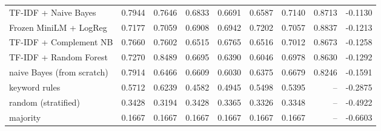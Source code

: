 \begin{table}[htbp]
\begin{tabular}{lrrrrrrrr}
TF-IDF + Naive Bayes & 0.7944 & 0.7646 & 0.6833 & 0.6691 & 0.6587 & 0.7140 & 0.8713 & -0.1130 \\
Frozen MiniLM + LogReg & 0.7177 & 0.7059 & 0.6908 & 0.6942 & 0.7202 & 0.7057 & 0.8837 & -0.1213 \\
TF-IDF + Complement NB & 0.7660 & 0.7602 & 0.6515 & 0.6765 & 0.6516 & 0.7012 & 0.8673 & -0.1258 \\
TF-IDF + Random Forest & 0.7270 & 0.8489 & 0.6695 & 0.6390 & 0.6046 & 0.6978 & 0.8630 & -0.1292 \\
naive Bayes (from scratch) & 0.7914 & 0.6466 & 0.6609 & 0.6030 & 0.6375 & 0.6679 & 0.8246 & -0.1591 \\
keyword rules & 0.5712 & 0.6239 & 0.4582 & 0.4945 & 0.5498 & 0.5395 & -- & -0.2875 \\
random (stratified) & 0.3428 & 0.3194 & 0.3428 & 0.3365 & 0.3326 & 0.3348 & -- & -0.4922 \\
majority & 0.1667 & 0.1667 & 0.1667 & 0.1667 & 0.1667 & 0.1667 & -- & -0.6603 \\
\bottomrule
\end{tabular}
\end{table}

